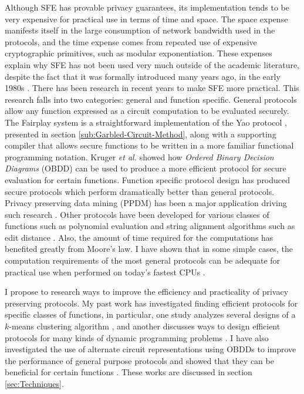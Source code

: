 Although SFE has provable privacy guarantees, its implementation tends
to be very expensive for practical use in terms of time and space.
The space expense manifests itself in the large consumption of network
bandwidth used in the protocols, and the time expense comes from repeated
use of expensive cryptographic primitives, such as modular exponentiation.
These expenses explain why SFE has not been used very much outside
of the academic literature, despite the fact that it was formally
introduced many years ago, in the early 1980s \cite{Y82}. There has
been research in recent years to make SFE more practical. This research
falls into two categories: general and function specific. General
protocols allow any function expressed as a circuit computation to
be evaluated securely. The Fairplay system \cite{Fairplay} is a straightforward
implementation of the Yao protocol \cite{Yao86}, presented in section
\ref{sub:Garbled-Circuit-Method}, along with a supporting compiler
that allows secure functions to be written in a more familiar functional
programming notation. Kruger \emph{et al.} \cite{kruger06} showed
how \emph{Ordered Binary Decision Diagrams} (OBDD) can be used to
produce a more efficient protocol for secure evaluation for certain
functions. Function specific protocol design has produced secure protocols
which perform dramatically better than general protocols. Privacy
preserving data mining (PPDM) has been a major application driving
such research \cite{verykios04stateart}. Other protocols have been
developed for various classes of functions such as polynomial evaluation
\cite{naor99otope} and string alignment algorithms such as edit distance
\cite{kruger07}. Also, the amount of time required for the computations
has benefited greatly from Moore's law. I have shown that in some
simple cases, the computation requirements of the most general protocols
can be adequate for practical use when performed on today's fastest
CPUs \cite{kruger06}.

I propose to research ways to improve the efficiency and practicality
of privacy preserving protocols. My past work has investigated finding
efficient protocols for specific classes of functions, in particular,
one study analyzes several designs of a $k$-means clustering algorithm
\cite{kruger05}, and another discusses ways to design efficient protocols
for many kinds of dynamic programming problems \cite{kruger07}. I
have also investigated the use of alternate circuit representations
using OBDDs to improve the performance of general purpose protocols
and showed that they can be beneficial for certain functions \cite{kruger06}.
These works are discussed in section \ref{sec:Techniques}.


